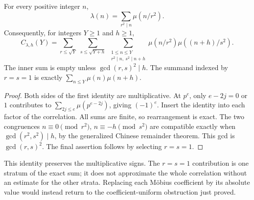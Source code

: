 \begin{lemma}
\label{lem:v1-square-divisor}
For every positive integer \(n\),
\[
 \lambda(n)=\sum_{r^2\mid n}\mu(n/r^2).
\]
Consequently, for integers \(Y\ge1\) and \(h\ge1\),
\begin{equation}\label{eq:v1-square-correlation}
 C_{\lambda,h}(Y)=
 \sum_{r\le\sqrt Y}\ \sum_{s\le\sqrt{Y+h}}
 \ \sum_{\substack{1\le n\le Y\\r^2\mid n,\ s^2\mid n+h}}
     \mu(n/r^2)\mu((n+h)/s^2).
\end{equation}
The inner sum is empty unless \(\gcd(r,s)^2\mid h\).
The summand indexed by \(r=s=1\) is exactly
\(\sum_{n\le Y}\mu(n)\mu(n+h)\).
\end{lemma}
\begin{proof}
Both sides of the first identity are multiplicative. At \(p^e\),
only \(e-2j=0\) or \(1\) contributes to
\(\sum_{2j\le e}\mu(p^{e-2j})\), giving \((-1)^e\).
Insert the identity into each factor of the correlation. All
sums are finite, so rearrangement is exact. The two congruences
\(n\equiv0\pmod{r^2}\), \(n\equiv-h\pmod{s^2}\) are compatible
exactly when \(\gcd(r^2,s^2)\mid h\), by the generalized Chinese
remainder theorem. This gcd is \(\gcd(r,s)^2\). The final
assertion follows by selecting \(r=s=1\).
\end{proof}

This identity preserves the multiplicative signs. The
\(r=s=1\) contribution is one stratum of the exact sum; it
does not approximate the whole correlation without an estimate
for the other strata. Replacing each M\"obius coefficient by its
absolute value would instead return to the coefficient-uniform
obstruction just proved.
